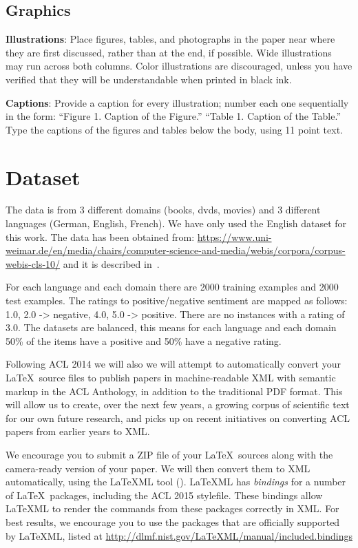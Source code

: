 \documentclass[11pt,a4paper]{article}
\begin{document}
\subsection{Graphics}

{\bf Illustrations}: Place figures, tables, and photographs in the
paper near where they are first discussed, rather than at the end, if
possible.  Wide illustrations may run across both columns.  Color
illustrations are discouraged, unless you have verified that
they will be understandable when printed in black ink.

{\bf Captions}: Provide a caption for every illustration; number each one
sequentially in the form:  ``Figure 1. Caption of the Figure.'' ``Table 1.
Caption of the Table.''  Type the captions of the figures and
tables below the body, using 11 point text.


\section{Dataset}
The data is from 3 different domains (books, dvds, movies) and 3 different languages (German, English, French).
We have only used the English dataset for this work. The data has been obtained from: \url{https://www.uni-weimar.de/en/media/chairs/computer-science-and-media/webis/corpora/corpus-webis-cls-10/} and it is described in~\cite{PB:2010}.

For each language and each domain there are 2000 training examples and 2000 test examples. The ratings to positive/negative sentiment are mapped as follows: 1.0, 2.0 -> negative, 4.0, 5.0 -> positive. There are no instances with a rating of 3.0. The datasets are balanced, this means for each language and each domain 50\% of the items have a positive and 50\% have a negative rating.

Following ACL 2014 we will also we will attempt to automatically convert
your \LaTeX\ source files to publish papers in machine-readable
XML with semantic markup in the ACL Anthology, in addition to the
traditional PDF format.  This will allow us to create, over the next
few years, a growing corpus of scientific text for our own future research,
and picks up on recent initiatives on converting ACL papers from earlier
years to XML.

We encourage you to submit a ZIP file of your \LaTeX\ sources along
with the camera-ready version of your paper. We will then convert them
to XML automatically, using the LaTeXML tool
(). LaTeXML has \emph{bindings} for
a number of \LaTeX\ packages, including the ACL 2015 stylefile. These
bindings allow LaTeXML to render the commands from these packages
correctly in XML. For best results, we encourage you to use the
packages that are officially supported by LaTeXML, listed at
\url{http://dlmf.nist.gov/LaTeXML/manual/included.bindings}
\end{document}
